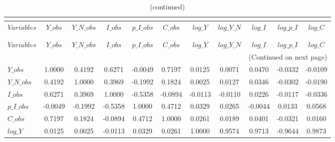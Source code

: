  
\begin{center}
\begin{longtable}{lcccccccccc} 
\caption{MATRIX OF CORRELATIONS}\\
 \label{Table:th_corr_matrix}\\
\toprule 
$Variables  $	 & 	 $      Y\_obs$	 & 	 $  Y\_N\_obs$	 & 	 $      I\_obs$	 & 	 $  p\_I\_obs$	 & 	 $      C\_obs$	 & 	 $      log\_Y$	 & 	 $  log\_Y\_N$	 & 	 $      log\_I$	 & 	 $  log\_p\_I$	 & 	 $      log\_C$\\
\midrule \endfirsthead 
\caption{(continued)}\\
 \toprule \\ 
$Variables  $	 & 	 $      Y\_obs$	 & 	 $  Y\_N\_obs$	 & 	 $      I\_obs$	 & 	 $  p\_I\_obs$	 & 	 $      C\_obs$	 & 	 $      log\_Y$	 & 	 $  log\_Y\_N$	 & 	 $      log\_I$	 & 	 $  log\_p\_I$	 & 	 $      log\_C$\\
\midrule \endhead 
\midrule \multicolumn{11}{r}{(Continued on next page)} \\ \bottomrule \endfoot 
\bottomrule \endlastfoot 
$Y\_obs     $	 & 	       1.0000	 & 	       0.4192	 & 	       0.6271	 & 	      -0.0049	 & 	       0.7197	 & 	       0.0125	 & 	       0.0071	 & 	       0.0470	 & 	      -0.0332	 & 	      -0.0109 \\ 
$Y\_N\_obs  $	 & 	       0.4192	 & 	       1.0000	 & 	       0.3969	 & 	      -0.1992	 & 	       0.1824	 & 	       0.0025	 & 	       0.0127	 & 	       0.0346	 & 	      -0.0302	 & 	      -0.0190 \\ 
$I\_obs     $	 & 	       0.6271	 & 	       0.3969	 & 	       1.0000	 & 	      -0.5358	 & 	      -0.0894	 & 	      -0.0113	 & 	      -0.0110	 & 	       0.0226	 & 	      -0.0117	 & 	      -0.0336 \\ 
$p\_I\_obs  $	 & 	      -0.0049	 & 	      -0.1992	 & 	      -0.5358	 & 	       1.0000	 & 	       0.4712	 & 	       0.0329	 & 	       0.0265	 & 	      -0.0044	 & 	       0.0133	 & 	       0.0568 \\ 
$C\_obs     $	 & 	       0.7197	 & 	       0.1824	 & 	      -0.0894	 & 	       0.4712	 & 	       1.0000	 & 	       0.0261	 & 	       0.0189	 & 	       0.0401	 & 	      -0.0321	 & 	       0.0160 \\ 
$log\_Y     $	 & 	       0.0125	 & 	       0.0025	 & 	      -0.0113	 & 	       0.0329	 & 	       0.0261	 & 	       1.0000	 & 	       0.9574	 & 	       0.9713	 & 	      -0.9644	 & 	       0.9873 \\ 

\end{longtable}
\end{center}
